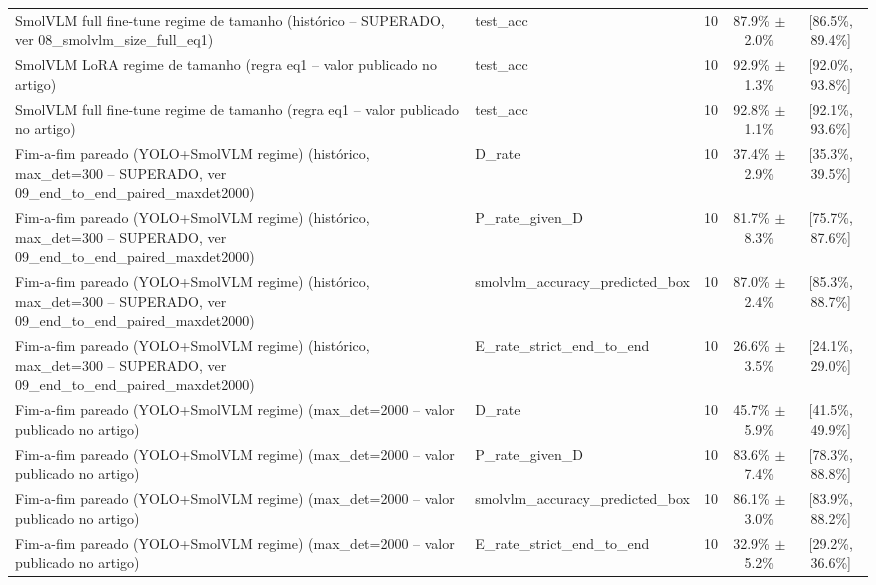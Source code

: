 \begin{table}[H]
\begin{tabular}{llccc}
        SmolVLM full fine-tune regime de tamanho (histórico -- SUPERADO, ver 08_smolvlm_size_full_eq1) & test_acc & 10 & 87.9\% $\pm$ 2.0\% & [86.5\%, 89.4\%] \\
        SmolVLM LoRA regime de tamanho (regra eq1 -- valor publicado no artigo) & test_acc & 10 & 92.9\% $\pm$ 1.3\% & [92.0\%, 93.8\%] \\
        SmolVLM full fine-tune regime de tamanho (regra eq1 -- valor publicado no artigo) & test_acc & 10 & 92.8\% $\pm$ 1.1\% & [92.1\%, 93.6\%] \\
        Fim-a-fim pareado (YOLO+SmolVLM regime) (histórico, max_det=300 -- SUPERADO, ver 09_end_to_end_paired_maxdet2000) & D_rate & 10 & 37.4\% $\pm$ 2.9\% & [35.3\%, 39.5\%] \\
        Fim-a-fim pareado (YOLO+SmolVLM regime) (histórico, max_det=300 -- SUPERADO, ver 09_end_to_end_paired_maxdet2000) & P_rate_given_D & 10 & 81.7\% $\pm$ 8.3\% & [75.7\%, 87.6\%] \\
        Fim-a-fim pareado (YOLO+SmolVLM regime) (histórico, max_det=300 -- SUPERADO, ver 09_end_to_end_paired_maxdet2000) & smolvlm_accuracy_predicted_box & 10 & 87.0\% $\pm$ 2.4\% & [85.3\%, 88.7\%] \\
        Fim-a-fim pareado (YOLO+SmolVLM regime) (histórico, max_det=300 -- SUPERADO, ver 09_end_to_end_paired_maxdet2000) & E_rate_strict_end_to_end & 10 & 26.6\% $\pm$ 3.5\% & [24.1\%, 29.0\%] \\
        Fim-a-fim pareado (YOLO+SmolVLM regime) (max_det=2000 -- valor publicado no artigo) & D_rate & 10 & 45.7\% $\pm$ 5.9\% & [41.5\%, 49.9\%] \\
        Fim-a-fim pareado (YOLO+SmolVLM regime) (max_det=2000 -- valor publicado no artigo) & P_rate_given_D & 10 & 83.6\% $\pm$ 7.4\% & [78.3\%, 88.8\%] \\
        Fim-a-fim pareado (YOLO+SmolVLM regime) (max_det=2000 -- valor publicado no artigo) & smolvlm_accuracy_predicted_box & 10 & 86.1\% $\pm$ 3.0\% & [83.9\%, 88.2\%] \\
        Fim-a-fim pareado (YOLO+SmolVLM regime) (max_det=2000 -- valor publicado no artigo) & E_rate_strict_end_to_end & 10 & 32.9\% $\pm$ 5.2\% & [29.2\%, 36.6\%] \\
        \hline
    \end{tabular}
\end{table}